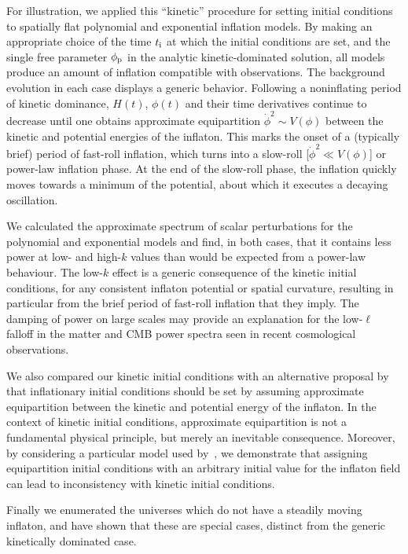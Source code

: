 For illustration, we applied this ``kinetic'' procedure for setting initial conditions to spatially flat polynomial and exponential inflation models.  By making an appropriate choice of the time \(t_{\mathrm{i}}\) at which the initial conditions are set, and the single free parameter \(\phi_{\mathrm{p}}\) in the analytic kinetic-dominated solution, all models produce an amount of inflation compatible with observations.  The background evolution in each case displays a generic behavior.  Following a noninflating period of kinetic dominance, \(H(t)\), \(\phi(t)\) and their time derivatives continue to decrease until one obtains approximate equipartition \(\dot{\phi}^2 \sim V(\phi)\) between the kinetic and potential energies of the inflaton. This marks the onset of a (typically brief) period of fast-roll inflation, which turns into a slow-roll [\(\dot{\phi}^2 \ll V(\phi)\)] or power-law inflation phase.  At the end of the slow-roll phase, the inflation quickly moves towards a minimum of the potential, about which it executes a decaying oscillation.

We calculated the approximate spectrum of scalar perturbations for the polynomial and exponential models and find, in both cases, that it contains less power at low- and high-\(k\) values than would be expected from a power-law behaviour. The low-\(k\) effect is a generic consequence of the kinetic initial conditions, for any consistent inflaton potential or spatial curvature, resulting in particular from the brief period of fast-roll inflation that they imply.  The damping of power on large scales may provide an explanation for the low-\(\ell\) falloff in the matter and CMB power spectra seen in recent cosmological observations.

We also compared our kinetic initial conditions with an alternative proposal by~\cite{boyanovsky_cmb_2006} that inflationary initial conditions should be set by assuming approximate equipartition between the kinetic and potential energy of the inflaton.  In the context of kinetic initial conditions, approximate equipartition is not a fundamental physical principle, but merely an inevitable consequence.  Moreover, by considering a particular model used by~\cite{boyanovsky_cmb_2006}, we demonstrate that assigning equipartition initial conditions with an arbitrary initial value for the inflaton field can lead to inconsistency with kinetic initial conditions.

Finally we enumerated the universes which do not have a steadily moving inflaton, and have shown that these are special cases, distinct from the generic kinetically dominated case.





\begin{subappendices}
  
\end{subappendices}

